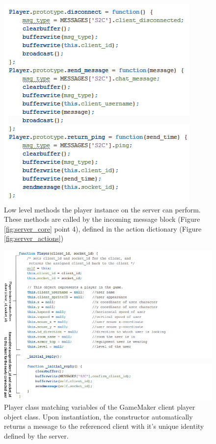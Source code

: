 \documentclass[bsc, 12pt, twoside, singlespacing, parskip, abbrevs, notimes, normalheadings, logo]{styles/infthesis}
\begin{document}
\begin{figure}
\includegraphics[scale=0.65]{images/server_player_functions.jpg}
\caption{Low level methods the player instance on the server can perform. These methods are called by the incoming message block (Figure \ref{fig:server_core} point 4), defined in the action dictionary (Figure \ref{fig:server_actions})}
\label{fig:server_player_functions}
\end{figure}

\begin{figure}
\includegraphics[scale=0.75]{images/server_player_construct.jpg}
\caption{Player class matching variables of the GameMaker client player object class. Upon instantiation, the constructor automatically returns a message to the referenced client with it's unique identity defined by the server.}
\label{fig:server_player_construct}
\vspace{1em}
\end{figure}
\end{document}
